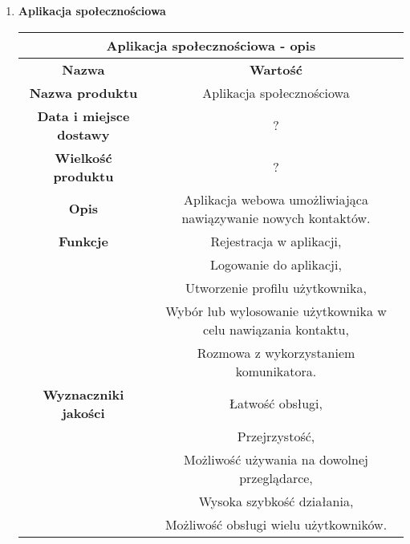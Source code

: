 \documentclass[12pt,a4paper]{article}
\begin{document}
\begin{enumerate}
    \item \textbf{Aplikacja społecznościowa}
    \begin{table}[htb]
    \centering
      \begin{tabular}{|c|c|}
      \hline
      \multicolumn{2}{|c|}{Aplikacja społecznościowa - opis} \\
      \hline
      {\bf Nazwa} & {\bf Wartość} \\
      \hline
      \textbf{Nazwa produktu} & Aplikacja społecznościowa \\
      \hline
      \textbf{Data i miejsce dostawy} & ? \\
      \hline
      \textbf{Wielkość produktu} & ? \\
      \hline
      \textbf{Opis} & Aplikacja webowa umożliwiająca nawiązywanie nowych kontaktów.  \\
      \hline
      \textbf{Funkcje} 
                      & Rejestracja w aplikacji, \\
                      & Logowanie do aplikacji, \\
                      & Utworzenie profilu użytkownika, \\
                      & Wybór lub wylosowanie użytkownika w celu nawiązania kontaktu, \\
                      & Rozmowa z wykorzystaniem komunikatora. \\
      
      \hline
      \textbf{Wyznaczniki jakości} 
                      & Łatwość obsługi, \\
                      & Przejrzystość, \\
                      & Możliwość używania na dowolnej przeglądarce, \\
                      & Wysoka szybkość działania, \\
                      & Możliwość obsługi wielu użytkowników. \\
      

\end{tabular}
\end{table}
\end{enumerate}
\end{document}
